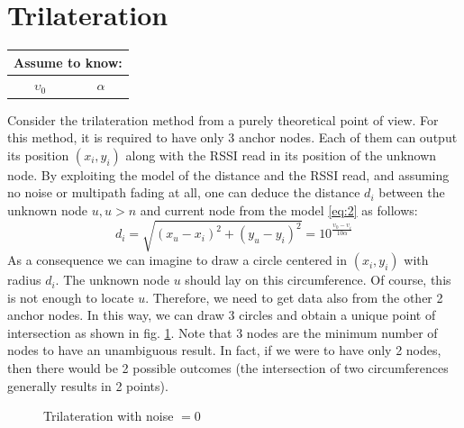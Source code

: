\documentclass[12pt]{report}
\begin{document}
\clearpage
\section{Trilateration}
 \begin{center}
    \begin{tabular}{ |c|c| } 
    \hline
    \multicolumn{2}{|c|}{ \textbf{Assume to know:} } \\
    \hline
    $\upsilon_0$ & $\alpha$ \\
    \hline
    \end{tabular}
\end{center}
Consider the trilateration method from a purely theoretical point of view. For this method, it is required to have only 3 anchor nodes. Each of them can output its position $(x_i,y_i)$ along with the RSSI read in its position of the unknown node. By exploiting the model of the distance and the RSSI read, and assuming no noise or multipath fading at all, one can deduce the distance $d_i$ between the unknown node $u, u>n$ and current node from the model \eqref{eq:2} as follows:  
\begin{equation}
    d_i=\sqrt{(x_u-x_i)^2+(y_u-y_i)^2}=10^{\frac{\upsilon_0-\upsilon_i}{10\alpha}}   
    \label{eq:18}
\end{equation}
As a consequence we can imagine to draw a circle centered in $(x_i,y_i)$ with radius $d_i$. The unknown node $u$ should lay on this circumference. Of course, this is not enough to locate $u$. Therefore, we need to get data also from the other 2 anchor nodes. In this way, we can draw 3 circles and obtain a unique point of intersection as shown in fig. \ref{fig:trilOK}. Note that 3 nodes are the minimum number of nodes to have an unambiguous result. In fact, if we were to have only 2 nodes, then there would be 2 possible outcomes (the intersection of two circumferences generally results in 2 points).
\begin{figure}
    \centering
    \caption{Trilateration with noise $=0$}
    \label{fig:trilOK}
\end{figure}
\end{document}
